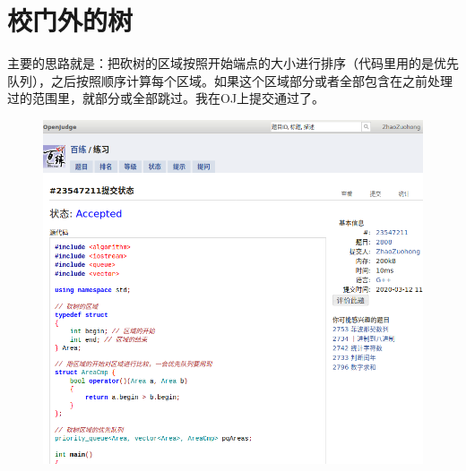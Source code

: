 \documentclass[UTF8,zihao=-4]{ctexart}
\begin{document}
    \section*{校门外的树}
    主要的思路就是：把砍树的区域按照开始端点的大小进行排序（代码里用的是优先队列），之后按照顺序计算每个区域。如果这个区域部分或者全部包含在之前处理过的范围里，就部分或全部跳过。我在OJ上提交通过了。
    \begin{figure}[htb]
        \includegraphics[width=\linewidth]{ac.png}
    \end{figure}
\end{document}
